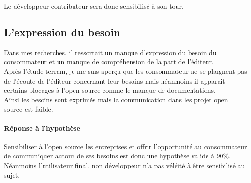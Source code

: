 		Le développeur contributeur sera donc sensibilisé à son tour.

	\subsection{L'expression du besoin}

		Dans mes recherches, il ressortait un manque d'expression du besoin du consommateur et un manque de compréhension de la part de l'éditeur.\\

		Après l'étude terrain, je me suis aperçu que les consommateur ne se plaignent pas de l'écoute de l'éditeur concernant leur besoins mais néanmoins il apparait certains blocages à l'open source comme le manque de documentations.\\

		Ainsi les besoins sont exprimés mais la communication dans les projet open source est faible.

\paragraph{Réponse à l'hypothèse\\}

		Sensibiliser à l'open source les entreprises et offrir l'opportunité au consommateur de communiquer autour de ses besoins est donc une hypothèse valide à 90\%. Néanmoins l'utilisateur final, non développeur n'a pas véléité à être sensibilisé au sujet.










